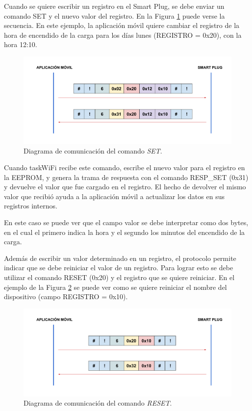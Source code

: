 Cuando se quiere escribir un registro en el Smart Plug, se debe enviar un comando SET y el nuevo valor del registro. En la Figura \ref{fig:comunicacion_set} puede verse la secuencia. En este ejemplo, la aplicación móvil quiere cambiar el registro de la hora de encendido de la carga para los días lunes (REGISTRO = 0x20), con la hora 12:10. 

\begin{figure}[h]
	\centering
	\includegraphics[width=14cm]{./Figures/3_2_5_comunicacion_SET.pdf}
	\caption{Diagrama de comunicación del comando \textit{SET}.}
	\label{fig:comunicacion_set}
\end{figure}

Cuando taskWiFi recibe este comando, escribe el nuevo valor para el registro en la EEPROM, y genera la trama de respuesta con el comando RESP\_SET (0x31) y devuelve el valor que fue cargado en el registro. El hecho de devolver el mismo valor que recibió ayuda a la aplicación móvil a actualizar los datos en sus registros internos.

En este caso se puede ver que el campo valor se debe interpretar como dos bytes, en el cual el primero indica la hora y el segundo los minutos del encendido de la carga.

Además de escribir un valor determinado en un registro, el protocolo permite indicar que se debe reiniciar el valor de un registro. Para lograr esto se debe utilizar el comando RESET (0x20) y el registro que se quiere reiniciar. En el ejemplo de la Figura \ref{fig:comunicacion_reset} se puede ver como se quiere reiniciar el nombre del dispositivo (campo REGISTRO = 0x10).

\begin{figure}[h]
	\centering
	\includegraphics[width=14cm]{./Figures/3_2_5_comunicacion_RESET.pdf}
	\caption{Diagrama de comunicación del comando \textit{RESET}.}
	\label{fig:comunicacion_reset}
\end{figure}

